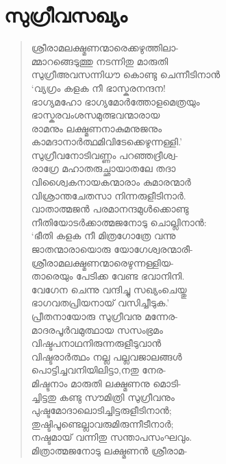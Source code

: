 
\section{സുഗ്രീവസഖ്യം}

\begin{verse}
ശ്രീരാമലക്ഷ്മണന്മാരെക്കഴുത്തിലാ-\\
മ്മാറങ്ങെടുത്തു നടന്നിതു മാരുതി\\
സുഗ്രീഅവസന്നിധൗ കൊണ്ടു ചെന്നീടിനാന്‍\\
‘വ്യഗ്രം കളക നീ ഭാസ്കരനന്ദന!\\
ഭാഗ്യമഹോ ഭാഗ്യമോര്‍ത്തോളമെത്രയും\\
ഭാസ്കരവംശസമുത്ഭവന്മാരായ\\
രാമനും ലക്ഷ്മണനാകുമനുജനും\\
കാമദാനാര്‍ത്ഥമിവിടേക്കെഴുന്നള്ളി.’\\
സുഗ്രീവനോടിവണ്ണം പറഞ്ഞദ്രീശ്വ-\\
രാഗ്രേ മഹാതരുച്ഛായാതലേ തദാ\\
വിശ്വൈകനായകന്മാരാം കുമാരന്മാര്‍\\
വിശ്രാന്തചേതസാ നിന്നരുളീടിനാര്‍.\\
വാതാത്മജന്‍ പരമാനന്ദമുള്‍ക്കൊണ്ടു\\
നീതിയോടര്‍ക്കാത്മജനോടു ചൊല്ലിനാന്‍:\\
‘ഭീതി കളക നീ മിത്രഗോത്രേ വന്നു\\
ജാതന്മാരായൊരു യോഗേശ്വരന്മാരീ-\\
ശ്രീരാമലക്ഷ്മണന്മാരെഴുന്നള്ളിയ-\\
താരെയും പേടിക്ക വേണ്ട ഭവാനിനി.\\
വേഗേന ചെന്നു വന്ദിച്ചു സഖ്യംചെയ്തു\\
ഭാഗവതപ്രിയനായ് വസിച്ചീടുക.’\\
പ്രീതനായോരു സുഗ്രീവനു മന്നേര-\\
മാദരപൂര്‍വമുത്ഥായ സസംഭ്രമം\\
വിഷ്ടപനാഥനിരുന്നരുളീടുവാന്‍\\
വിഷ്ടരാര്‍ത്ഥം നല്ല പല്ലവജാലങ്ങള്‍\\
പൊട്ടിച്ചവനിയിലിട്ടാ,നതു നേര-\\
മിഷ്ടനാം മാരുതി ലക്ഷ്മണനു മൊടി-\\
ച്ചിട്ടതു കണ്ടു സൗമിത്രി സുഗ്രീവനും\\
പുഷ്ടമോദാലൊടിച്ചിട്ടരുളീടിനാന്‍;\\
തുഷ്ടിപൂണ്ടെല്ലാവരുമിരുന്നീടീനാര്‍;\\
നഷ്ടമായ് വന്നിതു സന്താപസംഘവും.\\
മിത്രാത്മജനോടു ലക്ഷ്മണന്‍ ശ്രീരാമ-\\

\end{verse}
